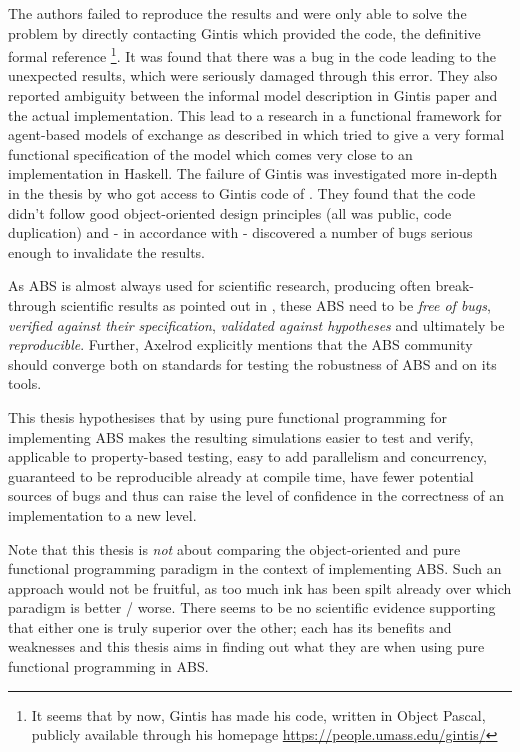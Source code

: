 The authors \cite{ionescu_dependently-typed_2012} failed to reproduce the results and were only able to solve the problem by directly contacting Gintis which provided the code, the definitive formal reference \footnote{It seems that by now, Gintis has made his code, written in Object Pascal, publicly available through his homepage \url{https://people.umass.edu/gintis/}}. It was found that there was a bug in the code leading to the unexpected results, which were seriously damaged through this error. They also reported ambiguity between the informal model description in Gintis paper and the actual implementation.
This lead to a research in a functional framework for agent-based models of exchange as described in \cite{botta_functional_2011} which tried to give a very formal functional specification of the model which comes very close to an implementation in Haskell. The failure of Gintis was investigated more in-depth in the thesis by \cite{evensen_extensible_2010} who got access to Gintis code of \cite{gintis_emergence_2006}. They found that the code didn't follow good object-oriented design principles (all was public, code duplication) and - in accordance with \cite{ionescu_dependently-typed_2012} - discovered a number of bugs serious enough to invalidate the results. 

As ABS is almost always used for scientific research, producing often break-through scientific results as pointed out in \cite{axelrod_chapter_2006}, these ABS need to be \textit{free of bugs}, \textit{verified against their specification}, \textit{validated against hypotheses} and ultimately be \textit{reproducible}. Further, Axelrod explicitly mentions that the ABS community should converge both on standards for testing the robustness of ABS and on its tools.

\bigskip

This thesis hypothesises that by using pure functional programming for implementing ABS makes the resulting simulations easier to test and verify, applicable to property-based testing, easy to add parallelism and concurrency, guaranteed to be reproducible already at compile time, have fewer potential sources of bugs and thus can raise the level of confidence in the correctness of an implementation to a new level.

\medskip

Note that this thesis is \textit{not} about comparing the object-oriented and pure functional programming paradigm in the context of implementing ABS. Such an approach would not be fruitful, as too much ink has been spilt already over which paradigm is better / worse. There seems to be no scientific evidence supporting that either one is truly superior over the other; each has its benefits and weaknesses and this thesis aims in finding out what they are when using pure functional programming in ABS.

